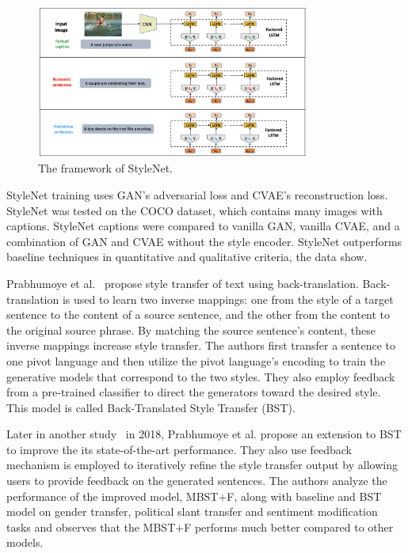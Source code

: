\documentclass[akbc,twoside,11pt]{article}
\begin{document}
\begin{figure}[h]
    \centering
    \includegraphics[width=0.8\textwidth]{assets/stylenet}
    \caption{The framework of StyleNet.}
    \label{fig:stylenet}
\end{figure}

StyleNet training uses GAN's adversarial loss and CVAE's reconstruction loss. StyleNet was tested on the COCO dataset, which contains many images with captions. StyleNet captions were compared to vanilla GAN, vanilla CVAE, and a combination of GAN and CVAE without the style encoder. StyleNet outperforms baseline techniques in quantitative and qualitative criteria, the data show.

Prabhumoye et al.~\cite{prabhumoye2018style} propose style transfer of text using back-translation. Back-translation is used to learn two inverse mappings: one from the style of a target sentence to the content of a source sentence, and the other from the content to the original source phrase. By matching the source sentence's content, these inverse mappings increase style transfer. The authors first transfer a sentence to one pivot language and then utilize the pivot language's encoding to train the generative models that correspond to the two styles. They also employ feedback from a pre-trained classifier to direct the generators toward the desired style. This model is called Back-Translated Style Transfer (BST). 

Later in another study~\cite{prabhumoye2018style2} in 2018, Prabhumoye et al. propose an extension to BST to improve the its state-of-the-art performance. They also use feedback mechanism is employed to iteratively refine the style transfer output by allowing users to provide feedback on the generated sentences. The authors analyze the performance of the improved model, MBST+F, along with baseline and BST model on gender transfer, political slant transfer and sentiment modification tasks and observes that the MBST+F performs much better compared to other models.
\end{document}
